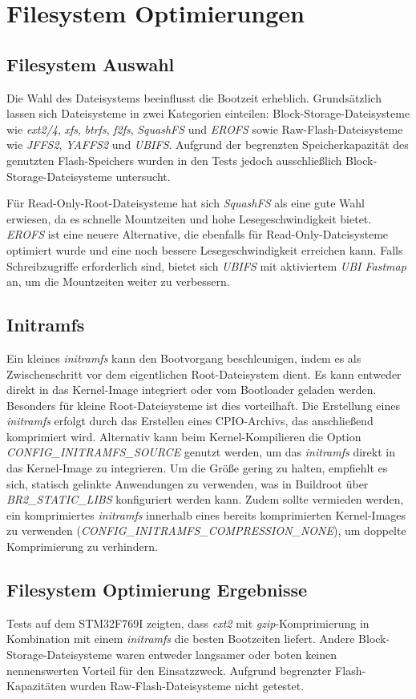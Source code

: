 
\section{Filesystem Optimierungen}

\subsection{Filesystem Auswahl}
Die Wahl des Dateisystems beeinflusst die Bootzeit erheblich. Grundsätzlich lassen sich Dateisysteme in zwei Kategorien einteilen: Block-Storage-Dateisysteme wie \textit{ext2/4}, \textit{xfs}, \textit{btrfs}, \textit{f2fs}, \textit{SquashFS} und \textit{EROFS} sowie Raw-Flash-Dateisysteme wie \textit{JFFS2}, \textit{YAFFS2} und \textit{UBIFS}. Aufgrund der begrenzten Speicherkapazität des genutzten Flash-Speichers wurden in den Tests jedoch ausschließlich Block-Storage-Dateisysteme untersucht.

Für Read-Only-Root-Dateisysteme hat sich \textit{SquashFS} als eine gute Wahl erwiesen, da es schnelle Mountzeiten und hohe Lesegeschwindigkeit bietet. \textit{EROFS} ist eine neuere Alternative, die ebenfalls für Read-Only-Dateisysteme optimiert wurde und eine noch bessere Lesegeschwindigkeit erreichen kann. Falls Schreibzugriffe erforderlich sind, bietet sich \textit{UBIFS} mit aktiviertem \textit{UBI Fastmap} an, um die Mountzeiten weiter zu verbessern.

\subsection{Initramfs}
Ein kleines \textit{initramfs} kann den Bootvorgang beschleunigen, indem es als Zwischenschritt vor dem eigentlichen Root-Dateisystem dient. Es kann entweder direkt in das Kernel-Image integriert oder vom Bootloader geladen werden. Besonders für kleine Root-Dateisysteme ist dies vorteilhaft. Die Erstellung eines \textit{initramfs} erfolgt durch das Erstellen eines CPIO-Archivs, das anschließend komprimiert wird. Alternativ kann beim Kernel-Kompilieren die Option \textit{CONFIG\_INITRAMFS\_SOURCE} genutzt werden, um das \textit{initramfs} direkt in das Kernel-Image zu integrieren. Um die Größe gering zu halten, empfiehlt es sich, statisch gelinkte Anwendungen zu verwenden, was in Buildroot über \textit{BR2\_STATIC\_LIBS} konfiguriert werden kann. Zudem sollte vermieden werden, ein komprimiertes \textit{initramfs} innerhalb eines bereits komprimierten Kernel-Images zu verwenden (\textit{CONFIG\_INITRAMFS\_COMPRESSION\_NONE}), um doppelte Komprimierung zu verhindern.

\subsection{Filesystem Optimierung Ergebnisse}
Tests auf dem STM32F769I zeigten, dass \textit{ext2} mit \textit{gzip}-Komprimierung in Kombination mit einem \textit{initramfs} die besten Bootzeiten liefert. Andere Block-Storage-Dateisysteme waren entweder langsamer oder boten keinen nennenswerten Vorteil für den Einsatzzweck. Aufgrund begrenzter Flash-Kapazitäten wurden Raw-Flash-Dateisysteme nicht getestet.



